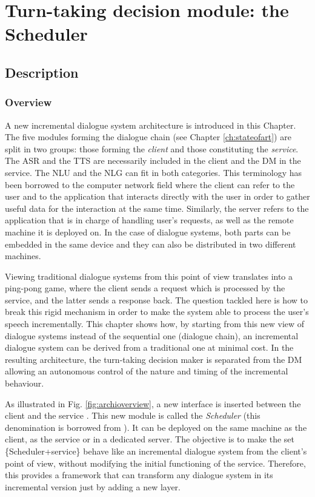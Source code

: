 \chapter{Turn-taking decision module: the Scheduler}

\label{ch:architecture}

\section{Description}
	\subsection{Overview}
    
    	A new incremental dialogue system architecture is introduced in this Chapter. The five modules forming the dialogue chain (see Chapter \ref{ch:stateofart}) are split in two groups: those forming the \textit{client} and those constituting the \textit{service}. The ASR and the TTS are necessarily included in the client and the  DM in the service. The NLU and the NLG can fit in both categories. This terminology has been borrowed to the computer network field \cite{Israel1978} where the client can refer to the user and to the application that interacts directly with the user in order to gather useful data for the interaction at the same time. Similarly, the server refers to the application that is in charge of handling user's requests, as well as the remote machine it is deployed on. In the case of dialogue systems, both parts can be embedded in the same device and they can also be distributed in two different machines.
        
        Viewing traditional dialogue systems from this point of view translates into a ping-pong game, where the client sends a request which is processed by the service, and the latter sends a response back. The question tackled here is how to break this rigid mechanism in order to make the system able to process the user's speech incrementally. This chapter shows how, by starting from this new view of dialogue systems instead of the sequential one (dialogue chain), an incremental dialogue system can be derived from a traditional one at minimal cost. In the resulting architecture, the turn-taking decision maker is separated from the DM allowing an autonomous control of the nature and timing of the incremental behaviour.
        
        As illustrated in Fig. \ref{fig:archioverview}, a new interface is inserted between the client and the service \cite{Khouzaimi2014a}. This new module is called the \textit{Scheduler} (this denomination is borrowed from \cite{Laroche2010a}). It can be deployed on the same machine as the client, as the service or in a dedicated server. The objective is to make the set \{Scheduler+service\} behave like an incremental dialogue system from the client's point of view, without modifying the initial functioning of the service. Therefore, this provides a framework that can transform any dialogue system in its incremental version just by adding a new layer.
				
